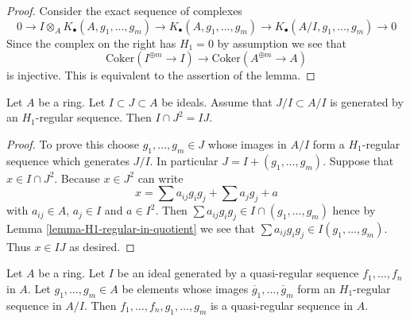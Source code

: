 \begin{proof}
Consider the exact sequence of complexes
$$
0 \to I \otimes_A K_\bullet(A, g_1, \ldots, g_m)
\to K_\bullet(A, g_1, \ldots, g_m) \to
K_\bullet(A/I, g_1, \ldots, g_m) \to 0
$$
Since the complex on the right has $H_1 = 0$ by assumption we
see that
$$
\text{Coker}(I^{\oplus m} \to I)
\longrightarrow
\text{Coker}(A^{\oplus m} \to A)
$$
is injective. This is equivalent to the assertion of the lemma.
\end{proof}

\begin{lemma}
\label{lemma-conormal-sequence-H1-regular}
Let $A$ be a ring. Let $I \subset J \subset A$ be ideals.
Assume that $J/I \subset A/I$ is generated by an $H_1$-regular sequence.
Then $I \cap J^2 = IJ$.
\end{lemma}

\begin{proof}
To prove this choose $g_1, \ldots, g_m \in J$
whose images in $A/I$ form a $H_1$-regular sequence which generates $J/I$.
In particular $J = I + (g_1, \ldots, g_m)$.
Suppose that $x \in I \cap J^2$. Because $x \in J^2$ can write
$$
x =
\sum a_{ij} g_ig_j +
\sum a_j g_j +
a
$$
with $a_{ij} \in A$, $a_j \in I$ and $a \in I^2$.
Then $\sum a_{ij}g_ig_j \in I \cap (g_1, \ldots, g_m)$
hence by
Lemma \ref{lemma-H1-regular-in-quotient}
we see that $\sum a_{ij}g_ig_j \in I(g_1, \ldots, g_m)$.
Thus $x \in IJ$ as desired.
\end{proof}

\begin{lemma}
\label{lemma-join-quasi-regular-H1-regular}
Let $A$ be a ring. Let $I$ be an ideal generated by a quasi-regular
sequence $f_1, \ldots, f_n$ in $A$. Let $g_1, \ldots, g_m \in A$ be
elements whose images $\overline{g}_1, \ldots, \overline{g}_m$ form an
$H_1$-regular sequence in $A/I$. Then $f_1, \ldots, f_n, g_1, \ldots, g_m$
is a quasi-regular sequence in $A$.
\end{lemma}

